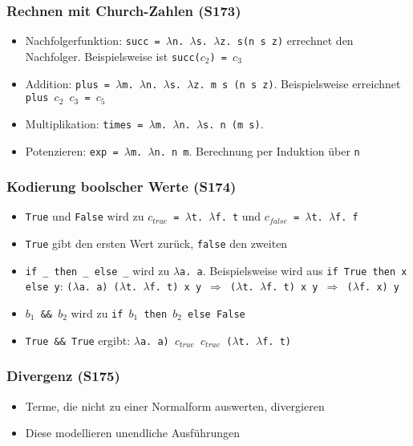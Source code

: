 \subsubsection{Rechnen mit Church-Zahlen (S173)}
\begin{itemize}
		\item Nachfolgerfunktion: \texttt{succ = \(\lambda\)n. \(\lambda\)s. \(\lambda\)z. s(n s z)} errechnet den Nachfolger. Beispielsweise ist \texttt{succ(\(c_2\)) = \(c_3\)}
		\item Addition: \texttt{plus = \(\lambda\)m. \(\lambda\)n. \(\lambda\)s. \(\lambda\)z. m s (n s z)}. Beispielsweise erreichnet \texttt{plus \(c_2\) \(c_3\) = \(c_5\)}
		\item Multiplikation: \texttt{times = \(\lambda\)m. \(\lambda\)n. \(\lambda\)s. n (m s)}.
		\item Potenzieren: \texttt{exp = \(\lambda\)m. \(\lambda\)n. n m}. Berechnung per Induktion über \texttt{n}
\end{itemize}

\subsubsection{Kodierung boolscher Werte (S174)}
\begin{itemize}
	\item \texttt{True} und \texttt{False} wird zu \texttt{\(c_{true}\) = \(\lambda\)t. \(\lambda\)f. t} und \texttt{\(c_{false}\) = \(\lambda\)t. \(\lambda\)f. f}
	\item \texttt{True} gibt den ersten Wert zurück, \texttt{false} den zweiten
	\item \texttt{if \_ then \_ else \_} wird zu \texttt{\(\lambda\)a. a}. Beispielsweise wird aus \texttt{if True then x else y}: \texttt{(\(\lambda\)a. a) (\(\lambda\)t. \(\lambda\)f. t) x y \(\Rightarrow\) (\(\lambda\)t. \(\lambda\)f. t) x y \(\Rightarrow\) (\(\lambda\)f. x) y}
	\item \texttt{\(b_1\) \&\& \(b_2\)} wird zu \texttt{if \(b_1\) then \(b_2\) else False}
	\item \texttt{True \&\& True} ergibt: \texttt{\(\lambda\)a. a) \(c_{true}\) \(c_{true}\) (\(\lambda\)t. \(\lambda\)f. t)}
\end{itemize}

\subsubsection{Divergenz (S175)}
\begin{itemize}
	\item Terme, die nicht zu einer Normalform auswerten, divergieren
	\item Diese modellieren unendliche Ausführungen
\end{itemize}

